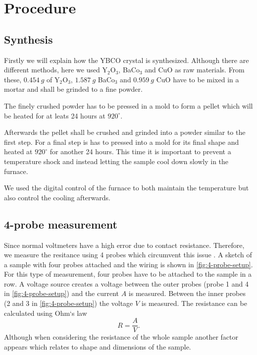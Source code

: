 \section{Procedure}
\label{sec:procedure}

\subsection{Synthesis}
\label{sec:synthesis}
Firstly we will explain how the YBCO crystal is synthesized. Although there are different methods,
here we used Y$_2$O$_3$, BaCo$_3$ and CuO as raw materials. From these, $\SI{0.454}{g}$ of
Y$_2$O$_3$, $\SI{1.587}{g}$ BaCo$_3$ and $\SI{0.959}{g}$ CuO have to be mixed in a mortar and shall
be grinded to a fine powder.

The finely crushed powder has to be pressed in a mold to form a pellet which will be heated for at
leats 24 hours at $920^\circ$.

Afterwards the pellet shall be crushed and grinded into a powder similar to the first step. For a
final step is has to pressed into a mold for its final shape and heated at $920^\circ$ for another
24 hours. This time it is important to prevent a temperature shock and instead letting the sample
cool down slowly in the furnace. 

We used the digital control of the furnace to both maintain the
temperature but also control the cooling afterwards.

\subsection{4-probe measurement}
\label{sec:4-probe measurement}
Since normal voltmeters have a high error due to contact resistance. Therefore, we measure the
resitance using 4 probes which circumvent this issue
\cite{Hofmann_2009,https://doi.org/10.1002/j.1538-7305.1958.tb03883.x}. A sketch of a sample with
four probes attached and the wiring is shown in \autoref{fig:4-probe-setup}. For this type of
measurement, four probes have to be attached to the sample in a row. A voltage source creates a
voltage between the outer probes (probe 1 and 4 in \autoref{fig:4-probe-setup}) and the current $A$ is
measured. Between the inner probes (2 and 3 in \autoref{fig:4-probe-setup}) the voltage $V$ is measured.
The resistance can be calculated using Ohm`s law
\begin{equation}
  R = \frac{A}{V}.
\end{equation}
Although when considering the resistance of the whole sample another factor appears which relates to
shape and dimensions of the sample.

